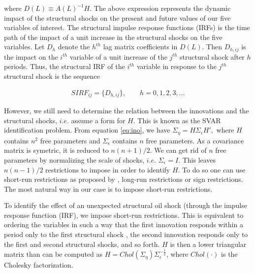 \documentclass[11pt,a4paper]{article}
\begin{document}
\noindent
where  $D(L) \equiv A(L)^{-1}  H$. 
The above expression represents the dynamic impact of the structural shocks on the present and future values of our five variables of interest.
The structural impulse response functions (IRFs) is the time path of the impact of a unit increase in the structural shocks on the five variables. Let $D_h$ denote the $h^{th}$ lag matrix coefficients in $D(L)$. Then $D_{h,ij}$ is the impact on the $i^{th}$ variable of a unit increase of the $j^{th}$ structural shock after $h$ periods. Thus, the structural IRF of the $i^{th}$ variable in response to the $j^{th}$ structural shock is the sequence 

{\footnotesize \begin{align*}
SIRF_{ij} = \{ D_{h,ij} \}, \qquad h = 0,1,2,3,\dots 
\end{align*}}

However, we still need to determine the relation between the innovations and the structural shocks, $i.e.$ assume a form for $H$.
This is known as the SVAR identification problem. From equation \eqref{eq:ino}, we have
$ \Sigma_\eta  = H \Sigma_\epsilon H', $
where $H$ contains $n^2$ free parameters and $\Sigma_\epsilon$ contains $n$ free parameters. As a covariance matrix is symetric, it is reduced to $n(n+1)/2$. We can get rid of $n$ free parameters by normalizing the scale of shocks, $i.e.$  $\Sigma_\epsilon = I$. This leaves $n(n-1)/2$ restrictions to impose in order to identify $H$.
To do so one can use short-run restrictions as proposed by \cite{sims1980macroeconomics}, long-run restrictions or sign restrictions. 
{\color{black}The most natural way in our case is to impose short-run restrictions.}

To identify the effect of an unexpected structural oil shock (through the impulse response function (IRF), we impose short-run restrictions. This is equivalent to ordering the variables in such a way that the first innovation responds within a period only to the first structural shock , the second innovation responds only to the first and second structural shocks, and so forth. $H$ is then a lower triangular matrix than can be computed as $H = Chol(\Sigma_\eta)\Sigma_\epsilon^{-\frac{1}{2}}$, where $Chol(\cdot)$ is the Cholesky factorization.



\end{document}
